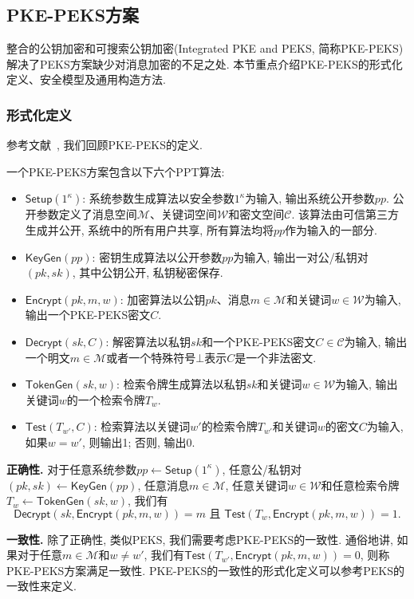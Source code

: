 \subsection{PKE-PEKS方案}
整合的公钥加密和可搜索公钥加密(Integrated PKE and PEKS, 简称PKE-PEKS)解决了PEKS方案缺少对消息加密的不足之处. 本节重点介绍PKE-PEKS的形式化定义、安全模型及通用构造方法.

\subsubsection{形式化定义}
参考文献~\cite{BSS2006,ZI2007,Chen-DCC-2016}, 我们回顾PKE-PEKS的定义. 
\begin{definition}
一个PKE-PEKS方案包含以下六个PPT算法:
\begin{itemize} \itemsep 1pt \parskip 0pt \parsep 0pt
\item $\mathsf{Setup}(1^\kappa)$: 系统参数生成算法以安全参数$1^\kappa$为输入, 输出系统公开参数$pp$. 公开参数定义了消息空间$\mathcal{M}$、关键词空间$\mathcal{W}$和密文空间$\mathcal{C}$. 该算法由可信第三方生成并公开, 系统中的所有用户共享, 所有算法均将$pp$作为输入的一部分.

\item $\mathsf{KeyGen}(pp)$: 密钥生成算法以公开参数$pp$为输入, 输出一对公/私钥对$(pk, sk)$, 其中公钥公开, 私钥秘密保存.

\item $\mathsf{Encrypt}(pk, m, w)$: 加密算法以公钥$pk$、消息$m \in \mathcal{M}$和关键词$w \in \mathcal{W}$为输入, 输出一个PKE-PEKS密文$C$.

\item $\mathsf{Decrypt}(sk, C)$: 解密算法以私钥$sk$和一个PKE-PEKS密文$C \in \mathcal{C}$为输入,
输出一个明文$m \in \mathcal{M}$或者一个特殊符号$\bot$表示$C$是一个非法密文.

\item $\mathsf{TokenGen}(sk, w)$: 检索令牌生成算法以私钥$sk$和关键词$w \in \mathcal{W}$为输入, 输出关键词$w$的一个检索令牌$T_w$.

\item $\mathsf{Test}(T_{w'}, C)$: 检索算法以关键词$w'$的检索令牌$T_{w'}$和关键词$w$的密文$C$为输入, 如果$w = w'$, 则输出1; 否则, 输出0.
\end{itemize}
\end{definition}
\begin{trivlist}
	\item \textbf{正确性.} 对于任意系统参数$pp \leftarrow \mathsf{Setup}(1^\kappa)$, 任意公/私钥对$(pk, sk) \leftarrow \mathsf{KeyGen}(pp)$, 任意消息$m \in \mathcal{M}$, 任意关键词$w \in \mathcal{W}$和任意检索令牌$T_w \leftarrow \mathsf{TokenGen}(sk, w)$, 我们有
\[
\mathsf{Decrypt}(sk, \mathsf{Encrypt}(pk, m, w)) = m \text{ 且 } \mathsf{Test}(T_w, \mathsf{Encrypt}(pk, m, w)) = 1.
\]
	\item \textbf{一致性.} 除了正确性, 类似PEKS, 我们需要考虑PKE-PEKS的一致性. 通俗地讲, 如果对于任意$m \in \mathcal{M}$和$w \neq w'$, 我们有$\mathsf{Test}(T_{w'}, \mathsf{Encrypt}(pk, m, w)) = 0$, 则称PKE-PEKS方案满足一致性. PKE-PEKS的一致性的形式化定义可以参考PEKS的一致性来定义.
\end{trivlist}


